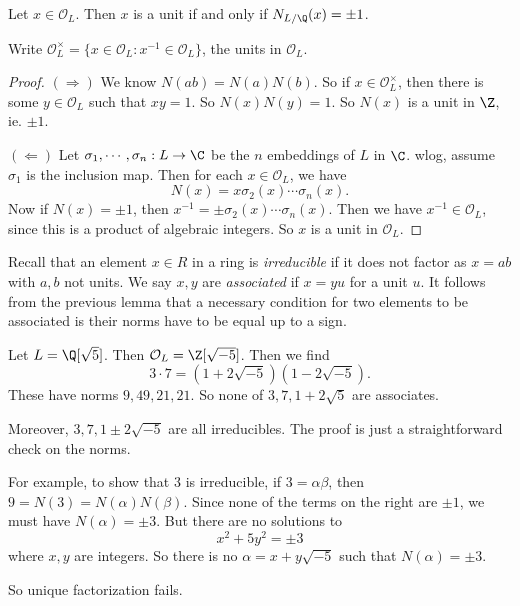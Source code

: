 \documentclass[a4paper]{article}
\begin{document}
\begin{lemma}
  Let $x \in \mathcal{O}_L$. Then $x$ is a unit if and only if $N_{L/\Q}(x) = \pm 1$.
\end{lemma}

\begin{notation}
  Write $\mathcal{O}_L^\times = \{x \in \mathcal{O}_L: x^{-1} \in \mathcal{O}_L\}$, the units in $\mathcal{O}_L$.
\end{notation}

\begin{proof}
  $(\Rightarrow)$ We know $N(a b) = N(a)N(b)$. So if $x \in \mathcal{O}_L^\times$, then there is some $y \in \mathcal{O}_L$ such that $xy = 1$. So $N(x) N(y) = 1$. So $N(x)$ is a unit in $\Z$, ie. $\pm 1$.

  $(\Leftarrow)$ Let $\sigma_1, \cdots, \sigma_n: L \to \C$ be the $n$ embeddings of $L$ in $\C$. wlog, assume $\sigma_1$ is the inclusion map. Then for each $x \in \mathcal{O}_L$, we have
  \[
    N(x) = x \sigma_2(x) \cdots \sigma_n(x).
  \]
  Now if $N(x) = \pm 1$, then $x^{-1} = \pm \sigma_2(x) \cdots \sigma_n(x)$. Then we have $x^{-1} \in \mathcal{O}_L$, since this is a product of algebraic integers. So $x$ is a unit in $\mathcal{O}_L$.
\end{proof}

Recall that an element $x \in R$ in a ring is \emph{irreducible} if it does not factor as $x = ab$ with $a, b$ not units. We say $x, y$ are \emph{associated} if $x = yu$ for a unit $u$. It follows from the previous lemma that a necessary condition for two elements to be associated is their norms have to be equal up to a sign.

\begin{eg}
  Let $L = \Q[\sqrt{5}]$. Then $\mathcal{O}_L = \Z[\sqrt{-5}]$. Then we find
  \[
    3 \cdot 7 = (1 + 2\sqrt{-5})(1 - 2\sqrt{-5}).
  \]
  These have norms $9, 49, 21, 21$. So none of $3, 7, 1 + 2\sqrt{5}$ are associates.

  Moreover, $3, 7, 1 \pm 2\sqrt{-5}$ are all irreducibles. The proof is just a straightforward check on the norms.

  For example, to show that $3$ is irreducible, if $3 = \alpha \beta$, then $9 = N(3) = N(\alpha) N(\beta)$. Since none of the terms on the right are $\pm 1$, we must have $N(\alpha) = \pm 3$. But there are no solutions to
  \[
    x^2 + 5y^2 = \pm 3
  \]
  where $x, y$ are integers. So there is no $\alpha = x + y\sqrt{-5}$ such that $N(\alpha) = \pm 3$.

  So unique factorization fails.
\end{eg}
\end{document}
